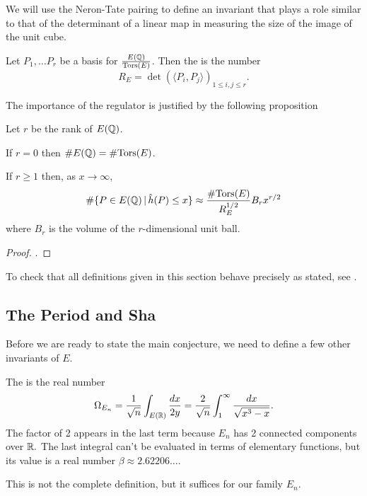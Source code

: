\documentclass[12pt, a4paper]{amsart}
\begin{document}
We will use the Neron-Tate pairing to define an invariant that plays a role
similar to that of the determinant of a linear map in measuring the size of
the image of the unit cube.

\begin{defn}[Regulator]
  Let $P_1, \dots P_r$ be a basis for $\frac{{E({\mathbb Q})}}{{\text{\normalfont Tors}} (E)}$.
  Then the  is the number
  \[R_E = \det ( \langle P_i, P_j \rangle)_{1\leq i, j \leq r}.\]
\end{defn}

The importance of the regulator is justified by the following proposition

\begin{prop}
  Let $r$ be the rank of $E({\mathbb Q})$.

  If $r = 0$ then $\# E({\mathbb Q}) = \# {\text{\normalfont Tors}}(E)$.

  If $r \geq 1$ then, as $x \rightarrow \infty$,
  \[\# \{P \in E({\mathbb Q}) \, | \, \hat{h}(P) \leq x \} \approx \frac{\#
      {\text{\normalfont Tors}}(E)}{R_E^{1/2}}
    B_r x^{r/2}\]
  where $B_r$ is the volume of the $r$-dimensional unit ball.
\end{prop}
\begin{proof}
  \cite[See][Chapter 13.7, page 127]{Granville}.
\end{proof}
  

\begin{remark}
  To check that all definitions given in this section behave precisely as
  stated, see \cite[Chapter 13.7-8, pages 123-127]{Granville}.
\end{remark}
  

\subsection{The Period and Sha}

Before we are ready to state the main conjecture, we need to define a few
other invariants of $E$. 

\begin{defn} 
  The  is the real number
  \[ \Omega_{E_n} = \frac{1}{\sqrt{n}} \int_{E({\mathbb R})} \frac{dx}{2y} =
    \frac{2}{ \sqrt{n}} \int_1^\infty \frac{dx}{\sqrt{x^3-x}}.\]
  The factor of 2 appears in the last term because $E_n$ has 2 connected
  components over ${\mathbb R}.$
  The last integral can't be evaluated in terms of elementary functions,
  but its value is a real number $\beta \approx 2.62206 \dots$.
\end{defn}
\begin{remark}
  This is not the complete definition, but it suffices for our family $E_n$.
\end{remark}
\end{document}
